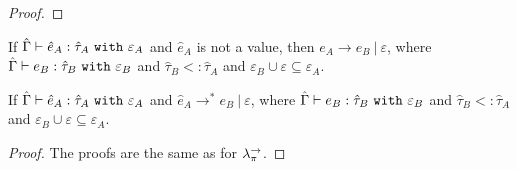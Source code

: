 \begin{appendix}
\begin{proof}
\end{proof}

\hrulefill

\begin{theorem}[Soundness]
If $\hat \Gamma \vdash \hat e_A: \hat \tau_A~\mathtt{with}~ \varepsilon_A$ and $\hat e_A$ is not a value, then $e_A \longrightarrow e_B~|~\varepsilon$, where $\hat \Gamma \vdash e_B: \hat \tau_B~\mathtt{with}~ \varepsilon_B$ and $\hat \tau_B <: \hat \tau_A$ and $\varepsilon_B \cup \varepsilon \subseteq \varepsilon_A$.
\end{theorem}


\begin{theorem}
If $\hat \Gamma \vdash \hat e_A: \hat \tau_A~\mathtt{with}~ \varepsilon_A$ and $\hat e_A \longrightarrow^{*} e_B~|~\varepsilon$, where $\hat \Gamma \vdash e_B: \hat \tau_B~\mathtt{with}~ \varepsilon_B$ and $\hat \tau_B <: \hat \tau_A$ and $\varepsilon_B \cup \varepsilon \subseteq \varepsilon_A$.
\end{theorem}


\begin{proof}
The proofs are the same as for $\lambda^{\rightarrow}_{\pi}$.
\end{proof}

\end{appendix}
